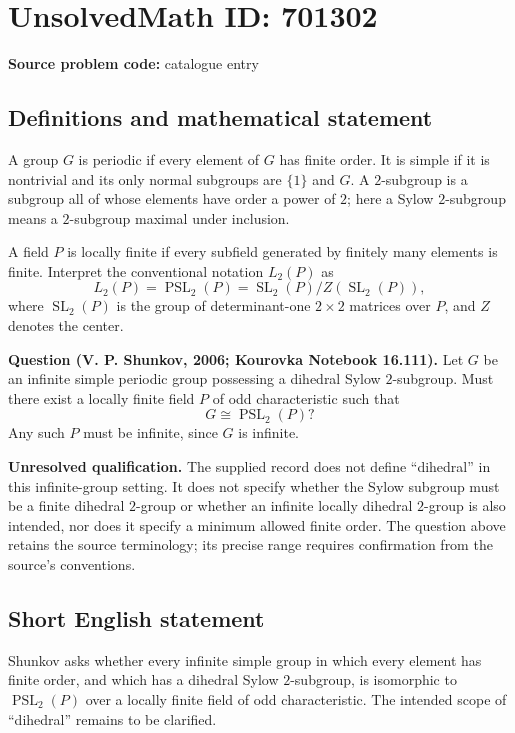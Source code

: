\documentclass[11pt]{article}
\begin{document}
\section*{UnsolvedMath ID: 701302}
\textbf{Source problem code:} catalogue entry
\subsection{Definitions and mathematical statement}
A group \(G\) is periodic if every element of \(G\) has finite order. It is simple if it is nontrivial and its only normal subgroups are \(\{1\}\) and \(G\). A \(2\)-subgroup is a subgroup all of whose elements have order a power of \(2\); here a Sylow \(2\)-subgroup means a \(2\)-subgroup maximal under inclusion.

A field \(P\) is locally finite if every subfield generated by finitely many elements is finite. Interpret the conventional notation \(L_2(P)\) as
\[
L_2(P)=\operatorname{PSL}_2(P)
=\operatorname{SL}_2(P)/Z(\operatorname{SL}_2(P)),
\]
where \(\operatorname{SL}_2(P)\) is the group of determinant-one \(2\times2\) matrices over \(P\), and \(Z\) denotes the center.

\textbf{Question (V. P. Shunkov, 2006; Kourovka Notebook 16.111).} Let \(G\) be an infinite simple periodic group possessing a dihedral Sylow \(2\)-subgroup. Must there exist a locally finite field \(P\) of odd characteristic such that
\[
G\cong\operatorname{PSL}_2(P)?
\]
Any such \(P\) must be infinite, since \(G\) is infinite.

\textbf{Unresolved qualification.} The supplied record does not define ``dihedral'' in this infinite-group setting. It does not specify whether the Sylow subgroup must be a finite dihedral \(2\)-group or whether an infinite locally dihedral \(2\)-group is also intended, nor does it specify a minimum allowed finite order. The question above retains the source terminology; its precise range requires confirmation from the source's conventions.
\subsection{Short English statement}
Shunkov asks whether every infinite simple group in which every element has finite order, and which has a dihedral Sylow \(2\)-subgroup, is isomorphic to \(\operatorname{PSL}_2(P)\) over a locally finite field of odd characteristic. The intended scope of ``dihedral'' remains to be clarified.
\end{document}
